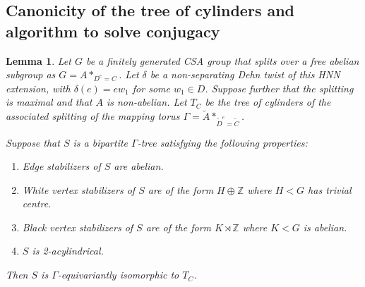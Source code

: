 \documentclass{amsart}
\newcommand{\Z}{\mathbb{Z}}
\theoremstyle{plain}
\newtheorem{lemma}[thm]{Lemma}
\theoremstyle{definition}
\theoremstyle{remark}
\begin{document}
\subsection{Canonicity of the tree of cylinders and algorithm to solve conjugacy}

\begin{lemma}
    \label{lem: canonicity lemma for tree of cylinders}
    Let $G$ be a finitely generated CSA group that splits over a free abelian subgroup as $G = A*_{D^e=C}$. Let $\delta$ be a non-separating Dehn twist of this HNN extension, with $\delta(e)=ew_1$ for some $w_1 \in D$. Suppose further that the splitting is maximal and that $A$ is non-abelian. Let $T_C$ be the tree of cylinders of the associated splitting of the mapping torus $\Gamma = \tilde{A}*_{\tilde{D}^e = \tilde{C}}$. 

    Suppose that $S$ is a bipartite $\Gamma$-tree satisfying the following properties: 

    \begin{enumerate}
        \item Edge stabilizers of $S$ are abelian.
        \item White vertex stabilizers of $S$ are of the form $H \oplus \Z$ where $H < G$ has trivial centre.
        \item Black vertex stabilizers of $S$ are of the form $K \rtimes \Z$ where $K < G$ is abelian.
        \item $S$ is 2-acylindrical.
    \end{enumerate}

    Then $S$ is $\Gamma$-equivariantly isomorphic to $T_C$. 
\end{lemma}
\end{document}
